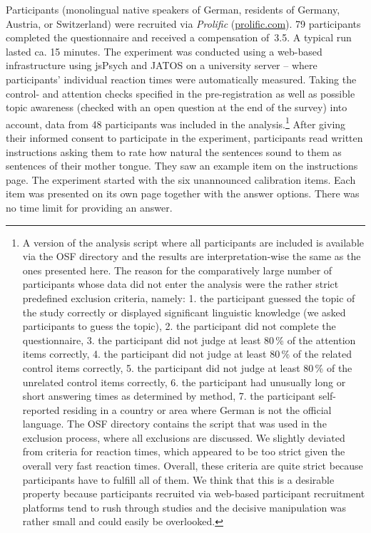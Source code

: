 \documentclass[output=paper,colorlinks,citecolor=brown]{langscibook}
\begin{document}
Participants (monolingual native speakers of German, residents of Germany, Austria, or Switzerland) were recruited via \textit{Prolific} (\href{https://www.prolific.com}{prolific.com}).
79 participants completed the questionnaire and received a compensation of \textsterling\,3.5.
A typical run lasted ca. 15 minutes.
The experiment was conducted using a web-based infrastructure using jsPsych \citep{deleeuw2015} and JATOS \citep{jatos} on a university server – where participants' individual reaction times were automatically measured.
Taking the control- and attention checks specified in the pre-registration as well as possible topic awareness (checked with an open question at the end of the survey) into account, data from 48 participants was included in the analysis.\footnote{A version of the analysis script where all participants are included is available via the OSF directory and the results are interpretation-wise the same as the ones presented here. The reason for the comparatively large number of participants whose data did not enter the analysis were the rather strict predefined exclusion criteria, namely: 1. the participant guessed the topic of the study correctly or displayed significant linguistic knowledge (we asked participants to guess the topic),
2. the participant did not complete the questionnaire,
3. the participant did not judge at least 80\,\% of the attention items correctly,
4. the participant did not judge at least 80\,\% of the related control items correctly,
5. the participant did not judge at least 80\,\% of the unrelated control items correctly,
6. the participant had unusually long or short answering times as determined by  method,
7. the participant self-reported residing in a country or area where German is not the official language.
The OSF directory contains the script that was used in the exclusion process, where all exclusions are discussed.
We slightly deviated from  criteria for reaction times, which appeared to be too strict given the overall very fast reaction times.
Overall, these criteria are quite strict because participants have to fulfill all of them.
We think that this is a desirable property because participants recruited via web-based participant recruitment platforms tend to rush through studies and the decisive manipulation was rather small and could easily be overlooked.}
After giving their informed consent to participate in the experiment, participants read written instructions asking them to rate how natural the sentences sound to them as sentences of their mother tongue.
They saw an example item on the instructions page.
The experiment started with the six unannounced calibration items.
Each item was presented on its own page together with the answer options.
There was no time limit for providing an answer.
\end{document}
